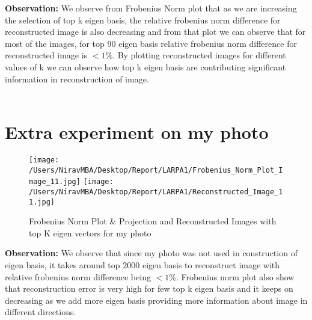 \documentclass[12pt]{report}
\begin{document}
\clearpage
{\bfseries Observation: } 
We observe from Frobenius Norm plot that as we are increasing the selection of top k eigen basis, the relative frobenius norm difference for reconstructed image is also decreasing and from that plot we can observe that for most of the images, for top 90 eigen basis relative frobenius norm difference for reconstructed image is $ < 1\% $. By plotting reconstructed images for different values of k we can observe how top k eigen basis are contributing significant information in reconstruction of image.\\ \\





\section*{\LARGE Extra experiment on my photo}

\begin{figure}[H]

	\texttt{[image: /Users/NiravMBA/Desktop/Report/LARPA1/Frobenius\_Norm\_Plot\_Image\_11.jpg]}
	\texttt{[image: /Users/NiravMBA/Desktop/Report/LARPA1/Reconstructed\_Image\_11.jpg]}
	\caption{Frobenius Norm Plot \& Projection and Reconstructed Images with top K eigen vectors for my photo }
	
\end{figure}

{\bfseries Observation: } 
We observe that since my photo was not used in construction of eigen basis, it takes around top 2000 eigen basis to reconstruct image with relative frobenius norm difference being $ < 1\% $. Frobenius norm plot also show that reconstruction error is very high for few top k eigen basis and it keeps on decreasing as we add more eigen basis providing more information about image in different directions.\\ \\
\end{document}
